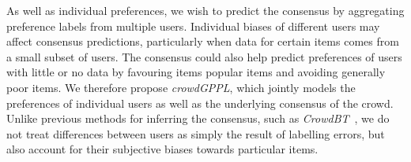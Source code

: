 As well as individual preferences, 
we wish to predict the consensus by aggregating
preference labels from multiple users. 
Individual biases of different users may affect consensus predictions,
particularly when data for certain items comes from a small subset of users.
The consensus could also help
predict preferences of users with little or no data
 by favouring items popular items
and avoiding generally poor items.
We therefore propose 
 \emph{crowdGPPL}, which jointly models 
the preferences of individual users as well as the underlying consensus of the crowd.
Unlike previous methods for inferring the consensus, 
such as \emph{CrowdBT}~\citep{chen2013pairwise}, we do not treat differences between users as simply the result of labelling errors, 
but also account for their subjective biases
towards particular items. 
 
